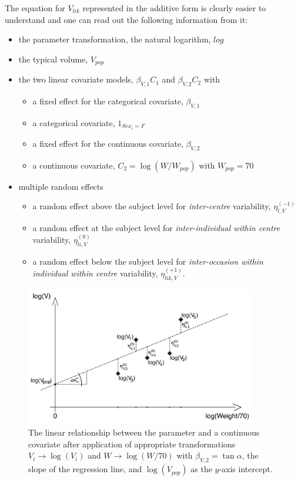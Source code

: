 The equation for $V_{lik}$ represented in the additive form is clearly easier to understand and one can read out the following information from it:
\begin{itemize}
\item
the parameter transformation, the natural logarithm, $log$
\item
the typical volume, $V_{pop}$
\item
the two linear covariate models, $\beta_{V,1} C_1$ and $\beta_{V,2} C_2$ with
\begin{itemize}
\item
a fixed effect for the categorical covariate, $\beta_{V,1}$
\item
a categorical covariate, $1_{Sex_i=F}$
\item
a fixed effect for the continuous covariate, $\beta_{V,2}$
\item
a continuous covariate, $C_2 = \log(W/W_{pop})$ with $W_{pop}=70$
\end{itemize}
\item
multiple random effects
\begin{itemize}
\item
a random effect above the subject level for \textit{inter-centre} variability, $\eta_{l,V}^{(-1)}$
\item
a random effect at the subject level for \textit{inter-individual within centre} variability, $\eta_{li,V}^{(0)}$
\item
a random effect below the subject level for \textit{inter-occasion within individual within centre} variability, $\eta_{lik,V}^{(+1)}$.
\end{itemize}
\end{itemize}


\begin{figure}[htbp]
\centering
 \includegraphics[width=100mm]{pics/weightAsCovariate.pdf}
\caption{The linear relationship between the parameter and a continuous covariate after application of appropriate transformations $V_i \longrightarrow \log(V_i)$ and $W \longrightarrow \log(W/70)$ with $\beta_{V,2} = \tan{\alpha}$, the slope of the regression line, and $\log(V_{pop})$ as the $y$-axis intercept.}
\label{fig:weightAsCovariate}
\end{figure}

